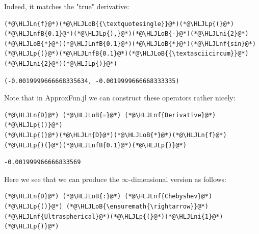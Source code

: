 \documentclass[12pt,a4paper]{article}
\newcommand{\HLJLn}[1]{#1}
\newcommand{\HLJLnf}[1]{\textcolor[RGB]{66,102,213}{#1}}
\newcommand{\HLJLnfB}[1]{\textcolor[RGB]{59,151,46}{#1}}
\newcommand{\HLJLni}[1]{\textcolor[RGB]{59,151,46}{#1}}
\newcommand{\HLJLoB}[1]{\textcolor[RGB]{102,102,102}{\textbf{#1}}}
\newcommand{\HLJLp}[1]{#1}
\begin{document}
Indeed, it matches the "true" derivative:


\begin{lstlisting}
(*@\HLJLn{f}@*)(*@\HLJLoB{{\textquotesingle}}@*)(*@\HLJLp{(}@*)(*@\HLJLnfB{0.1}@*)(*@\HLJLp{),}@*)(*@\HLJLoB{-}@*)(*@\HLJLni{2}@*)(*@\HLJLoB{*}@*)(*@\HLJLnfB{0.1}@*)(*@\HLJLoB{*}@*)(*@\HLJLnf{sin}@*)(*@\HLJLp{(}@*)(*@\HLJLnfB{0.1}@*)(*@\HLJLoB{{\textasciicircum}}@*)(*@\HLJLni{2}@*)(*@\HLJLp{)}@*)
\end{lstlisting}

\begin{lstlisting}
(-0.0019999666668335634, -0.0019999666668333335)
\end{lstlisting}


Note that in ApproxFun.jl we can construct these operators rather nicely:


\begin{lstlisting}
(*@\HLJLn{D}@*) (*@\HLJLoB{=}@*) (*@\HLJLnf{Derivative}@*)(*@\HLJLp{()}@*)
(*@\HLJLp{(}@*)(*@\HLJLn{D}@*)(*@\HLJLoB{*}@*)(*@\HLJLn{f}@*)(*@\HLJLp{)(}@*)(*@\HLJLnfB{0.1}@*)(*@\HLJLp{)}@*)
\end{lstlisting}

\begin{lstlisting}
-0.001999966666833569
\end{lstlisting}


Here we see that we can produce the \ensuremath{\infty}-dimensional version as follows:


\begin{lstlisting}
(*@\HLJLn{D}@*) (*@\HLJLoB{:}@*) (*@\HLJLnf{Chebyshev}@*)(*@\HLJLp{()}@*) (*@\HLJLoB{\ensuremath{\rightarrow}}@*) (*@\HLJLnf{Ultraspherical}@*)(*@\HLJLp{(}@*)(*@\HLJLni{1}@*)(*@\HLJLp{)}@*)
\end{lstlisting}
\end{document}
